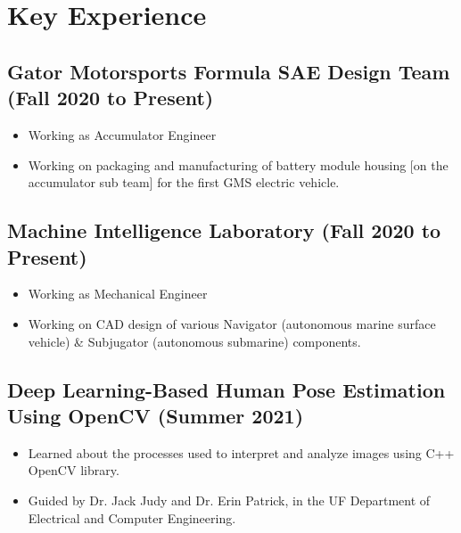 \documentclass{article}
\newcommand{\sectionspacing}{\vspace{-.2em}} %
\newenvironment{CustomItemize}
{ \begin{itemize}[leftmargin=1em]
    \setlength{\itemsep}{0pt}
    \setlength{\parskip}{0pt}
    \setlength{\parindent}{0pt}
    \setlength{\parsep}{0pt}     }
{ \end{itemize}                  }
\begin{document}

\sectionspacing{}

\section{Key Experience}
\subsection{Gator Motorsports Formula SAE Design Team (Fall 2020 to Present)}
\begin{CustomItemize}
\item Working as Accumulator Engineer 
\item Working on packaging and manufacturing of battery module housing [on the accumulator sub team] for the first GMS electric vehicle.
\end{CustomItemize}

\subsection{Machine Intelligence Laboratory (Fall 2020 to Present)}
\begin{CustomItemize}
\item Working as Mechanical Engineer
\item Working on CAD design of various Navigator (autonomous marine surface vehicle) \& Subjugator (autonomous submarine) components.
\end{CustomItemize}

\subsection{Deep Learning-Based Human Pose Estimation Using OpenCV (Summer 2021)}
\begin{CustomItemize}
\item Learned about the processes used to interpret and analyze images using C++ OpenCV library.
\item Guided by Dr. Jack Judy and Dr. Erin Patrick, in the UF Department of Electrical and Computer Engineering.
\end{CustomItemize}
\end{document}

